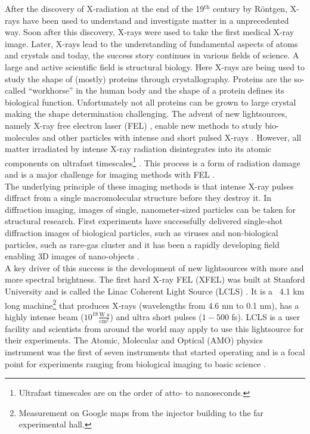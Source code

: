 After the discovery of X-radiation at the end of the 19$^{\text{th}}$ century by R\"ontgen, X-rays have been used to understand and investigate matter in a unprecedented way. Soon after this discovery, X-rays were used to take the first medical X-ray image. Later, X-rays lead to the understanding of fundamental aspects of atoms \citep{Siegbahn-NP} and crystals \citep{Laue-NP,Bragg-NP} and today, the success story continues in various fields of science. A large and active scientific field is structural biology. Here X-rays are being used to study the shape of (mostly) proteins through crystallography. Proteins are the so-called ``workhorse'' in the human body and the shape of a protein defines its biological function. Unfortunately not all proteins can be grown to large crystal making the shape determination challenging. The advent of new lightsources, namely X-ray free electron laser (FEL) \citep{Ackermann-2007-NPho}, enable new methods to study bio-molecules and other particles with intense and short pulsed X-rays \citep{Chapman-2006-NatPhys,Chapman-2011-Nature}. However, all matter irradiated by intense X-ray radiation disintegrates into its atomic components on ultrafast timescales\footnote{Ultrafast timescales are on the order of atto- to nanoseconds.} \citep{Neutze-2000-Nature}. This process is a form of radiation damage and is a major challenge for imaging methods with FEL \citep{Aquila-2015-StrucDyn}.\\[1\baselineskip]
%
The underlying principle of these imaging methods is that intense X-ray pulses diffract from a single macromolecular structure before they destroy it. In diffraction imaging, images of single, nanometer-sized particles can be taken for structural research. First experiments have successfully delivered single-shot diffraction images of biological particles, such as viruses \citep{Seibert-2011-Nature} and non-biological particles, such as rare-gas cluster \citep{Gomez-2014-Science} and it has been a rapidly developing field enabling 3D images of nano-objects \citep{Ekeberg-2015-PRL,Barke-2015-NatComm}.\\[1\baselineskip]
%
A key driver of this success is the development of new lightsources with more and more spectral brightness. The first hard X-ray FEL (XFEL) was built at Stanford University and is called the Linac Coherent Light Source (LCLS) \citep{Emma-2010-NatPho}. It is a ~4.1 km long machine\footnote{Measurement on Google maps from the injector building to the far experimental hall.} that produces X-rays (wavelengths from 4.6 nm to 0.1 nm), has a highly intense beam ($10^{18} \tfrac{\text{W s}}{\text{cm}^{2}}$) and ultra short pulses ($1-500$ fs). LCLS is a user facility and scientists from around the world may apply to use this lightsource for their experiments. The Atomic, Molecular and Optical (AMO) physics instrument was the first of seven instruments that started operating and is a focal point for experiments ranging from biological imaging to basic science \citep{Bostedt-2016-RMP}.\\[1\baselineskip]
